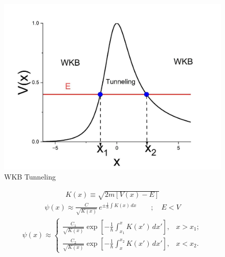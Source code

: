 \newpage
\begin{figure}[h]
	\centering
	\includegraphics[width=0.5\linewidth]{./figures/wkb-tunneling.png}
	\caption{WKB Tunneling}
	\label{fig:wkb-tunneling}
\end{figure}
\begin{align}
	K(x) \equiv \sqrt{2m[V(x)-E]}
\end{align}
\begin{align}
	\psi(x) \approx \frac{C}{\sqrt{K(x)}} \, e^{\pm \frac{1}{\hbar} \int K(x)\, dx}
	\qquad; \quad E < V
\end{align}
\begin{align}
	\psi(x) \approx \begin{cases}
		\frac{C_1}{\sqrt{K(x)}} \exp{\left[- \frac{1}{\hbar} \int_{x_1}^{x} K(x')\, dx' \right]}, & x>x_1;\\
		\frac{C_2}{\sqrt{K(x)}} \exp{\left[- \frac{1}{\hbar} \int_{x}^{x_2} K(x')\, dx' \right]}, & x<x_2.
	\end{cases}
\end{align}
 

